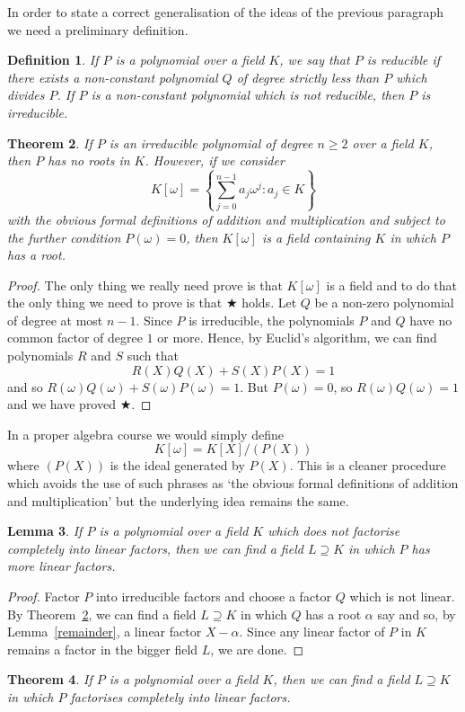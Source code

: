 \documentclass[12pt,a4paper]{article}
\theoremstyle{plain}
\newtheorem{theorem}{Theorem}[section]
\newtheorem{lemma}[theorem]{Lemma}
\newtheorem{definition}[theorem]{Definition}
\theoremstyle{definition}
\begin{document}
In order to state a correct generalisation of the
ideas of the previous paragraph we need a preliminary
definition.
\begin{definition} If $P$ is a polynomial over a field $K$,
we say that $P$ is \emph{reducible} if there exists
a non-constant polynomial $Q$ of degree strictly
less than $P$ which divides $P$. If $P$ is a
non-constant polynomial which is not
reducible, then $P$ is \emph{irreducible}.
\end{definition}
\begin{theorem}\label{add ideal} If $P$ is an irreducible
polynomial of degree $n\geq 2$ over a field $K$,
then $P$ has
no roots in $K$. However, if we consider
\[K[\omega]=
\left\{\sum_{j=0}^{n-1}a_{j}\omega^{j}:
a_{j}\in K\right\}\]
with the
obvious formal definitions of addition and multiplication
and subject to the further
condition $P(\omega)=0$, then
$K[\omega]$ is a field containing $K$
in which $P$ has a root.
\end{theorem}
\begin{proof}  The only thing we really
need prove is that
$K[\omega]$ is a field and to
do that the only thing we need to prove is that
$\bigstar$ holds. Let $Q$ be a non-zero
polynomial of
degree at most $n-1$.
Since $P$ is irreducible,
the polynomials $P$ and $Q$ have no common
factor of degree $1$ or more. Hence, by
Euclid's algorithm, we can find polynomials
$R$ and $S$ such that
\[R(X)Q(X)+S(X)P(X)=1\]
and so $R(\omega)Q(\omega)+S(\omega)P(\omega)=1$.
But $P(\omega)=0$, so $R(\omega)Q(\omega)=1$
and we have proved $\bigstar$.
\end{proof}
In a proper algebra course we would simply define
\[K[\omega]=K[X]/(P(X))\]
where $(P(X))$ is the ideal generated by $P(X)$.
This is a cleaner procedure which avoids the
use of such phrases as `the
obvious formal definitions of addition and multiplication'
but the underlying idea remains the same.
\begin{lemma} If $P$ is a polynomial over a field $K$
which does not factorise completely into linear
factors, then we can find a field $L\supseteq K$
in which $P$ has more linear factors.
\end{lemma}
\begin{proof} Factor $P$ into irreducible factors
and choose a factor $Q$ which is not linear.
By Theorem~\ref{add ideal}, we can find a field $L\supseteq K$
in which $Q$ has a root $\alpha$ say
and so, by Lemma~\ref{remainder},
a linear factor $X-\alpha$. Since any linear factor of
$P$ in $K$ remains a factor in the bigger field $L$,
we are done.
\end{proof}
\begin{theorem}\label{splits one}
If $P$ is a polynomial over a field $K$,
then we can find a field $L\supseteq K$
in which $P$ factorises completely
into linear factors.
\end{theorem}
\end{document}
